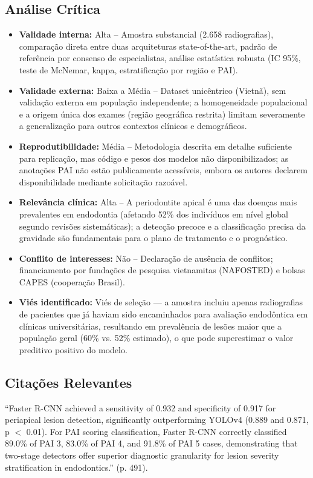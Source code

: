 \subsection{Análise Crítica}
\begin{itemize}
  \item \textbf{Validade interna:} Alta -- Amostra substancial (2.658
        radiografias), comparação direta entre duas arquiteturas
        state-of-the-art, padrão de referência por consenso de
        especialistas, análise estatística robusta (IC 95\%, teste
        de McNemar, kappa, estratificação por região e PAI).
  \item \textbf{Validade externa:} Baixa a Média -- Dataset
        unicêntrico (Vietnã), sem validação externa em população
        independente; a homogeneidade populacional e a origem
        única dos exames (região geográfica restrita) limitam
        severamente a generalização para outros contextos clínicos
        e demográficos.
  \item \textbf{Reprodutibilidade:} Média -- Metodologia descrita em
        detalhe suficiente para replicação, mas código e pesos dos
        modelos não disponibilizados; as anotações PAI não estão
        publicamente acessíveis, embora os autores declarem
        disponibilidade mediante solicitação razoável.
  \item \textbf{Relevância clínica:} Alta -- A periodontite apical é
        uma das doenças mais prevalentes em endodontia (afetando
        52\% dos indivíduos em nível global segundo revisões
        sistemáticas); a detecção precoce e a classificação precisa
        da gravidade são fundamentais para o plano de tratamento e
        o prognóstico.
  \item \textbf{Conflito de interesses:} Não -- Declaração de ausência
        de conflitos; financiamento por fundações de pesquisa
        vietnamitas (NAFOSTED) e bolsas CAPES (cooperação Brasil).
  \item \textbf{Viés identificado:} Viés de seleção — a amostra
        incluiu apenas radiografias de pacientes que já haviam sido
        encaminhados para avaliação endodôntica em clínicas
        universitárias, resultando em prevalência de lesões maior
        que a população geral (60\% vs. 52\% estimado), o que pode
        superestimar o valor preditivo positivo do modelo.
\end{itemize}

\subsection{Citações Relevantes}
\begin{citacao}
``Faster R-CNN achieved a sensitivity of 0.932 and specificity of
0.917 for periapical lesion detection, significantly outperforming
YOLOv4 (0.889 and 0.871, p $<$ 0.01). For PAI scoring classification,
Faster R-CNN correctly classified 89.0\% of PAI 3, 83.0\% of PAI 4,
and 91.8\% of PAI 5 cases, demonstrating that two-stage detectors
offer superior diagnostic granularity for lesion severity
stratification in endodontics.'' (p. 491).
\end{citacao}

